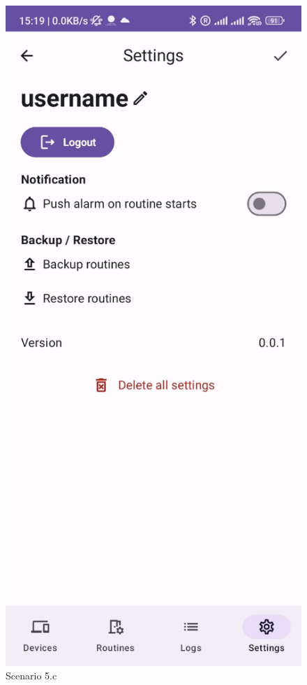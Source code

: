 \begin{enumerate}
\begin{enumerate}
\begin{figure}
        \includegraphics[width=0.5\linewidth]{imgs//usercase/scenario5-c.jpg}
        \caption{Scenario 5.c}
        \label{fig:enter-label}
    \end{figure}
    \end{enumerate}


\end{enumerate}
